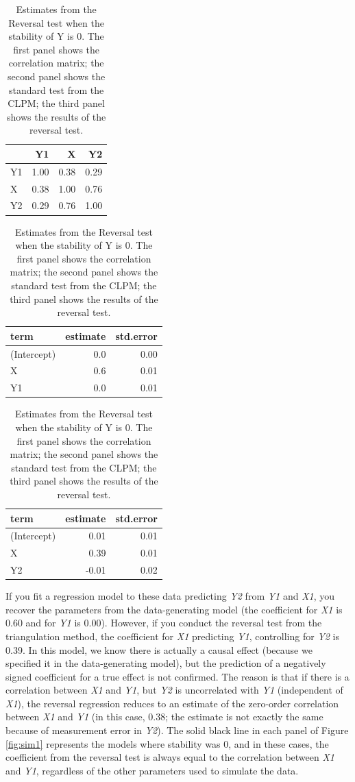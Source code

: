 \documentclass[
  man,mask,floatsintext]{apa6}
\begin{document}
\begin{table}
\caption{\label{tab:example}Estimates from the Reversal test when the stability of Y is 0. The first panel shows the correlation matrix; the second panel shows the standard test from the CLPM; the third panel shows the results of the reversal test.}

\centering
\begin{tabular}[t]{lrrr}
\toprule
  & Y1 & X & Y2\\
\midrule
Y1 & 1.00 & 0.38 & 0.29\\
X & 0.38 & 1.00 & 0.76\\
Y2 & 0.29 & 0.76 & 1.00\\
\bottomrule
\end{tabular}
\centering
\begin{tabular}[t]{lrr}
\toprule
term & estimate & std.error\\
\midrule
(Intercept) & 0.0 & 0.00\\
X & 0.6 & 0.01\\
Y1 & 0.0 & 0.01\\
\bottomrule
\end{tabular}
\centering
\begin{tabular}[t]{lrr}
\toprule
term & estimate & std.error\\
\midrule
(Intercept) & 0.01 & 0.01\\
X & 0.39 & 0.01\\
Y2 & -0.01 & 0.02\\
\bottomrule
\end{tabular}
\end{table}

If you fit a regression model to these data predicting \emph{Y2} from \emph{Y1} and \emph{X1}, you recover the parameters from the data-generating model (the coefficient for \emph{X1} is 0.60 and for \emph{Y1} is 0.00). However, if you conduct the reversal test from the triangulation method, the coefficient for \emph{X1} predicting \emph{Y1}, controlling for \emph{Y2} is 0.39. In this model, we know there is actually a causal effect (because we specified it in the data-generating model), but the prediction of a negatively signed coefficient for a true effect is not confirmed. The reason is that if there is a correlation between \emph{X1} and \emph{Y1}, but \emph{Y2} is uncorrelated with \emph{Y1} (independent of \emph{X1}), the reversal regression reduces to an estimate of the zero-order correlation between \emph{X1} and \emph{Y1} (in this case, 0.38; the estimate is not exactly the same because of measurement error in \emph{Y2}). The solid black line in each panel of Figure \ref{fig:sim1} represents the models where stability was 0, and in these cases, the coefficient from the reversal test is always equal to the correlation between \emph{X1} and \emph{Y1}, regardless of the other parameters used to simulate the data.
\end{document}
